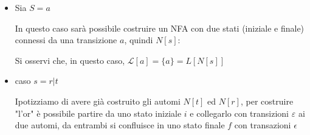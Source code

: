 {\begin{itemize}
\begin{center}
        \end{center}
        Si osservi che, in questo caso, $\mathcal{L}[\varepsilon] = \{\epsilon\}=L[N[s]]$
        \item Sia $S = a$
        
        In questo caso sarà possibile costruire un NFA con due stati (iniziale e finale) connessi da una transizione $a$, quindi $N[s]$:

        \begin{center}
        \end{center}

        Si osservi che, in questo caso, $\mathcal{L}[a] = \{a\}=L[N[s]]$
        \item caso $s= r|t$
        
        Ipotizziamo di avere già costruito gli automi $N[t]$ ed $N[r]$, per costruire "l'or" è possibile partire da uno stato iniziale $i$ e collegarlo con transizioni $\varepsilon$ ai due automi, da entrambi si confluisce in uno stato finale $f$ con transazioni $\epsilon$
        
        \begin{center}
\end{center}
\end{itemize}}

